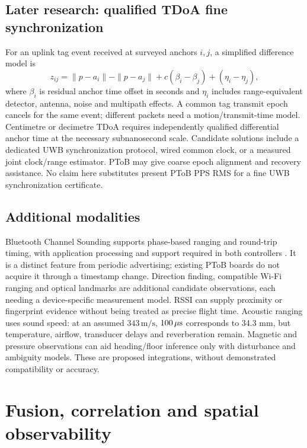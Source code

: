 \documentclass[11pt,letterpaper]{article}
\begin{document}
\subsection{Later research: qualified TDoA fine synchronization}
For an uplink tag event received at surveyed anchors $i,j$, a simplified difference model is
\begin{equation}
 z_{ij}=\|p-a_i\|-\|p-a_j\|+c(\beta_i-\beta_j)
          +(\eta_i-\eta_j),\label{eq:tdoa}
\end{equation}
where $\beta_i$ is residual anchor time offset in seconds and $\eta_i$ includes range-equivalent detector, antenna, noise and multipath effects. A common tag transmit epoch cancels for the same event; different packets need a motion/transmit-time model. Centimetre or decimetre TDoA requires independently qualified differential anchor time at the necessary subnanosecond scale. Candidate solutions include a dedicated UWB synchronization protocol, wired common clock, or a measured joint clock/range estimator. PToB may give coarse epoch alignment and recovery assistance. No claim here substitutes present PToB PPS RMS for a fine UWB synchronization certificate.

\subsection{Additional modalities}
Bluetooth Channel Sounding supports phase-based ranging and round-trip timing, with application processing and support required in both controllers \cite{channelsounding}. It is a distinct feature from periodic advertising; existing PToB boards do not acquire it through a timestamp change. Direction finding, compatible Wi-Fi ranging and optical landmarks are additional candidate observations, each needing a device-specific measurement model. RSSI can supply proximity or fingerprint evidence without being treated as precise flight time. Acoustic ranging uses sound speed: at an assumed $343\,\mathrm{m/s}$, $100\,\mu\mathrm{s}$ corresponds to 34.3 mm, but temperature, airflow, transducer delays and reverberation remain. Magnetic and pressure observations can aid heading/floor inference only with disturbance and ambiguity models. These are proposed integrations, without demonstrated compatibility or accuracy.

\section{Fusion, correlation and spatial observability}\label{sec:fusion}
\end{document}
